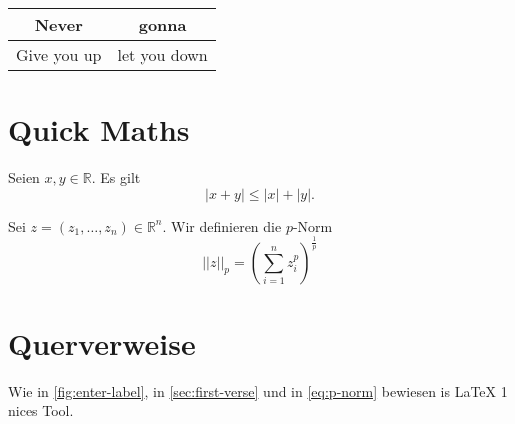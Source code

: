 \documentclass[a4]{article}
\begin{document}
\begin{table}
    \centering
    \begin{tabular}{c|c}
         Never & gonna \\
         \midrule
         Give you up & let you down
    \end{tabular}
\end{table}

\section{Quick Maths}

Seien \(x, y \in \mathbb{R}\). Es gilt
\[ |x+y| \leq |x| + |y|. \]

Sei \(z = (z_1, \dots, z_n) \in \mathbb{R}^n\).
Wir definieren die \(p\)-Norm
\begin{equation}
    ||z||_p = \left(\sum_{i=1}^n z_i^p\right)^\frac{1}{p}\label{eq:p-norm}
\end{equation}


\section{Querverweise}

Wie in \autoref{fig:enter-label}, in \autoref{sec:first-verse} und  in \autoref{eq:p-norm} bewiesen is \LaTeX{} 1 nices Tool.
\end{document}
